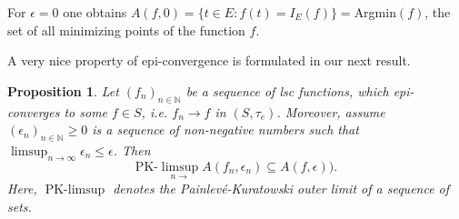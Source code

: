 \documentclass[sn-mathphys,Numbered]{sn-jnl}%
\theoremstyle{thmstyleone}%
\newtheorem{proposition}[theorem]{Proposition}%
\theoremstyle{thmstyletwo}%
\theoremstyle{thmstylethree}%
\begin{document}
For $\epsilon=0$ one obtains $A(f,0)=\{t \in E: f(t)=I_E(f)\}= $Argmin$(f)$, the set of all minimizing points of the function $f$.

\par
A very nice property of epi-convergence is formulated in our next result.\\

\begin{proposition} \label{PKconvergence} Let  $(f_n)_{n \in \mathbb{N}}$ be a sequence of lsc
functions, which epi-converges to some $f \in S$, i.e. $f_n \rightarrow f$ in $(S,\tau_e)$. Moreover, assume $(\epsilon_n)_{n \in \mathbb{N}} \ge 0 $ is a sequence
of non-negative numbers such that $\limsup_{n \rightarrow \infty} \epsilon_n \le \epsilon$.
Then
\begin{equation} \label{PKconv}
 \text{PK-}\limsup_{n \rightarrow} A(f_n,\epsilon_n) \subseteq A(f,\epsilon)).
\end{equation}
Here, $\text{PK-}\limsup$ denotes the \emph{Painlev\'{e}-Kuratowski outer limit} of a sequence of sets.
\end{proposition}
\end{document}
